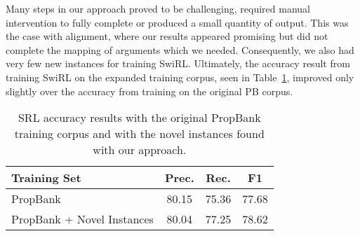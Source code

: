 Many steps in our approach proved to be challenging, required manual intervention to fully complete or produced a small quantity of output.  This was the case with alignment, where our results appeared promising but did not complete the mapping of arguments which we needed.  Consequently, we also had very few new instances for training SwiRL.  Ultimately, the accuracy result from training SwiRL on the expanded training corpus, seen in Table~\ref{tab:accuracy}, improved only slightly over the accuracy from training on the original PB corpus.
\begin{table}
\centering
\caption{SRL accuracy results with the original PropBank training corpus and with the novel instances found with our approach.}
\begin{tabular}{ | l | c | c | c |}
\hline
Training Set & Prec. & Rec. & F1 \\ \hline \hline
PropBank & 80.15 &  75.36 &  77.68 \\ \hline
PropBank + Novel Instances & 80.04 & 77.25 & 78.62 \\ \hline
\end{tabular}
\label{tab:accuracy}
\end{table}

